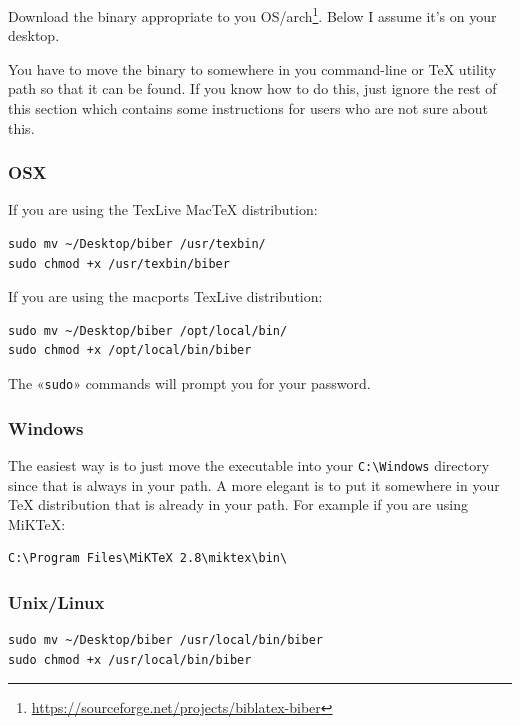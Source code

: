 \documentclass{ltxdockit}
\begin{document}
Download the binary appropriate to you
OS/arch\footnote{\url{https://sourceforge.net/projects/biblatex-biber}}. Below
I assume it's on your desktop.

You have to move the binary to somewhere in you command-line or TeX utility
path so that it can be found. If you know how to do this, just ignore the
rest of this section which contains some instructions for users who are
not sure about this.

\subsubsection{OSX}

If you are using the TexLive MacTeX distribution:

\begin{verbatim}
sudo mv ~/Desktop/biber /usr/texbin/
sudo chmod +x /usr/texbin/biber
\end{verbatim}

\noindent If you are using the macports TexLive distribution:

\begin{verbatim}
sudo mv ~/Desktop/biber /opt/local/bin/
sudo chmod +x /opt/local/bin/biber
\end{verbatim}

\noindent The «\verb+sudo+» commands will prompt you for your password.

\subsubsection{Windows}

The easiest way is to just move the executable into your \verb+C:\Windows+ directory since
that is always in your path. A more elegant is to put it somewhere in
your TeX distribution that is already in your path. For example if you
are using MiKTeX:

\begin{verbatim}
C:\Program Files\MiKTeX 2.8\miktex\bin\
\end{verbatim}

\subsubsection{Unix/Linux}

\begin{verbatim}
sudo mv ~/Desktop/biber /usr/local/bin/biber
sudo chmod +x /usr/local/bin/biber
\end{verbatim}
\end{document}
